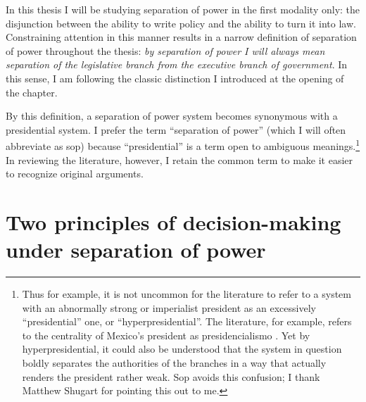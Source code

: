In this thesis I will be studying separation of power in the first modality only: the disjunction between the ability to write policy and the ability to turn it into law.  Constraining attention in this manner results in a narrow definition of separation of power throughout the thesis: \emph{by separation of power I will always mean separation of the legislative branch from the executive branch of government}.  In this sense, I am following the classic distinction I introduced at the opening of the chapter.  

By this definition, a separation of power system becomes synonymous with a presidential system.  I prefer the term ``separation of power'' (which I will often abbreviate as sop) because ``presidential'' is a term open to ambiguous meanings.\footnote{Thus for example, it is not uncommon for the literature to refer to a system with an abnormally strong or imperialist president as an excessively ``presidential'' one, or ``hyperpresidential''.  The literature, for example, refers to the centrality of Mexico's president as presidencialismo \citep{carpizo.1978,weldon.1997}. Yet by hyperpresidential, it could also be understood that the system in question boldly separates the authorities of the branches in a way that actually renders the president rather weak.  Sop avoids this confusion; I thank Matthew Shugart for pointing this out to me.}  In reviewing the literature, however, I retain the common term to make it easier to recognize original arguments.  

\section{Two principles of decision-making under separation of power}


